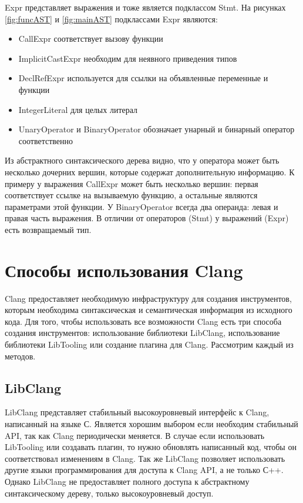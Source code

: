 Expr представляет выражения и тоже является подклассом Stmt. На рисунках \ref{fig:funcAST} и \ref{fig:mainAST}
подклассами Expr являются:
\begin{itemize}
 \item CallExpr соответствует вызову функции
 \item ImplicitCastExpr необходим для неявного приведения типов
 \item DeclRefExpr используется для ссылки на объявленные переменные и функции
 \item IntegerLiteral для целых литерал
 \item UnaryOperator и BinaryOperator обозначает унарный и бинарный оператор соответственно 
\end{itemize}
Из абстрактного синтаксического дерева видно, что у оператора может быть несколько дочерних
вершин, которые содержат дополнительную информацию. К примеру у выражения CallExpr может быть несколько вершин:
первая соответствует ссылке на вызываемую функцию, а остальные являются параметрами этой функции.
У BinaryOperator всегда два операнда: левая и правая часть выражения. 
В отличии от операторов (Stmt) у выражений (Expr) есть возвращаемый тип.  

\section{Способы использования Clang}
Clang предоставляет необходимую инфраструктуру для создания инструментов, которым необходима
синтаксическая и семантическая информация из исходного кода. Для того, чтобы использовать все 
возможности Clang есть три способа создания инструментов: использование библиотеки LibClang, 
использование библиотеки LibTooling или создание плагина для Clang. Рассмотрим каждый из методов.

\subsection*{LibClang}
LibClang представляет стабильный высокоуровневый интерфейс к Clang, написанный на языке С. 
Является хорошим выбором если необходим стабильный API, так как Clang периодически меняется.
В случае если использовать LibTooling или создавать плагин, то нужно обновлять написанный код,
чтобы он соответствовал изменениям в Clang. Так же LibClang позволяет использовать другие языки
программирования для доступа к Clang API, а не только С++. Однако LibClang не предоставляет полного доступа к 
абстрактному синтаксическому дереву, только высокоуровневый доступ.

